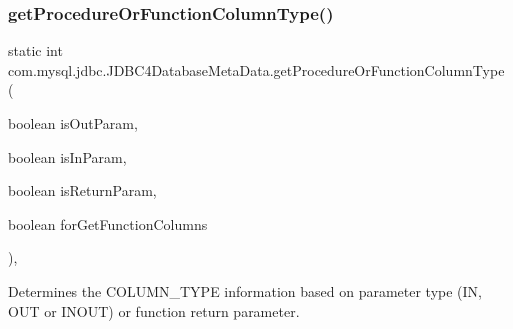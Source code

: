 \subsubsection{\texorpdfstring{get\+Procedure\+Or\+Function\+Column\+Type()}{getProcedureOrFunctionColumnType()}}
{\footnotesize\ttfamily static int com.\+mysql.\+jdbc.\+J\+D\+B\+C4\+Database\+Meta\+Data.\+get\+Procedure\+Or\+Function\+Column\+Type (\begin{DoxyParamCaption}\item[{boolean}]{is\+Out\+Param,  }\item[{boolean}]{is\+In\+Param,  }\item[{boolean}]{is\+Return\+Param,  }\item[{boolean}]{for\+Get\+Function\+Columns }\end{DoxyParamCaption})\hspace{0.3cm}{\ttfamily [static]}, {\ttfamily [protected]}}

Determines the C\+O\+L\+U\+M\+N\+\_\+\+T\+Y\+PE information based on parameter type (IN, O\+UT or I\+N\+O\+UT) or function return parameter.


